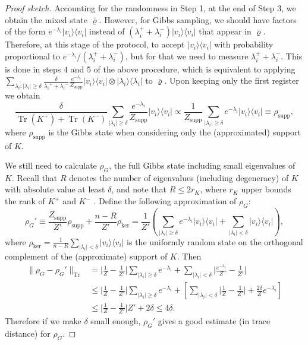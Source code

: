 \documentclass[a4paper,UKenglish,cleveref, autoref]{lipics-v2019}
\theoremstyle{remark}
\numberwithin{equation}{section}
\numberwithin{oracle}{section}
\numberwithin{remark}{section}
\newcommand{\ket}[1]{|#1\rangle}
\newcommand{\bra}[1]{\langle#1|}
\DeclareMathOperator{\tr}{Tr}
\begin{document}
\begin{proof}[Proof sketch]
Accounting for the randomness in Step 1, at the end of Step 3, we obtain  the mixed state $\bar\varrho$. However, for Gibbs sampling, we should have factors of the form  $e^{-\lambda_i}\ket{{v}_i}\bra{{v}_i}$ instead of $({\lambda}^+_i + {\lambda}^-_i) \ket{{v}_i}\bra{{v}_i}$ that appear in $\bar\varrho$. Therefore, at this stage of the protocol, to accept $\ket{{v}_i}\bra{{v}_i}$ with probability proportional to  $e^{-\lambda_i}/({\lambda}^+_i + {\lambda}^-_i)$, but for that we need to measure  ${\lambda}^+_i + {\lambda}^-_i$. This is done in steps 4 and 5 of the above procedure, which is equivalent to applying
$\sum_{\lambda_i:|\lambda_i|\ge\delta} \frac{\delta}{{\lambda_i}^+ +{\lambda_i}^-}\frac{e^{-{\lambda_i}}}{Z_{\text{supp}}} \ket{v_i}\bra{v_i}\otimes\ket{\lambda_i}\bra{\lambda_i}
$ to $\bar\varrho$. Upon keeping only the first register we obtain
\begin{equation}
\frac{\delta}{\tr(K^+)+\tr(K^-)}\sum_{|\lambda_i| \ge \delta} \frac{e^{-\lambda_i}}{Z_{\text{supp}}}\ket{v_i}\bra{v_i}\propto \frac{1}{Z_{\text{supp}}} \sum_{|\lambda_i| \ge \delta}  e^{-\lambda_i}\ket{v_i}\bra{v_i}\equiv\rho_{\text{supp}},
\end{equation}
where $\rho_{\text{supp}}$ is the Gibbs state when considering only the (approximated) support of $K$.

We still need to calculate $\rho_G$, the full Gibbs state including small eigenvalues of $K$. Recall that $R$ denotes the number of eigenvalues (including degeneracy) of $K$ with absolute value at least $\delta$, and note that $R \leq 2r_{K}$, where $r_{K}$ upper bounds the rank of $K^+$ and $K^-$ . Define the following approximation of $\rho_G$:
\begin{equation}
\rho_G' \equiv \frac{Z_{\text{supp}}}{Z'}\rho_{\text{supp}}+\frac{n-R}{Z'}\rho_{\text{ker}}= \frac{1}{Z'} (\sum_{|\lambda_i| \ge \delta} e^{-\lambda_i}\ket{v_i}\bra{v_i} + \sum_{|\lambda_i| < \delta} \ket{v_i}\bra{v_i}),
\end{equation}
where $\rho_{\text{ker}}=\frac{1}{n-R}\sum_{|\lambda_i| < \delta} \ket{v_i}\bra{v_i}$ is the  uniformly random state on the orthogonal complement of the (approximate) support of $K$.
Then
\begin{align}
\|\rho_G - \rho_G' \|_{\tr} &=\Big|\frac{1}{Z}-\frac{1}{Z'}\Big|\sum_{|\lambda_i|\ge\delta}e^{-\lambda_i}+\sum_{|\lambda_i|<\delta}\Big|\frac{e^{-\lambda_i}}{Z}-\frac{1}{Z'}\Big| \\
&\le\Big|\frac{1}{Z}-\frac{1}{Z'}\Big|\sum_{|\lambda_i|\ge\delta} e^{-\lambda_i}+\left[\sum_{|\lambda_i|<\delta}\Big|\frac{1}{Z}-\frac{1}{Z'}\Big|+\frac{2\delta}{Z}e^{-\lambda_i}\right] \\
&\le\Big|\frac{1}{Z}-\frac{1}{Z'}\Big|Z'+2\delta\le4\delta.
\end{align}
Therefore if we make $\delta$ small enough, $\rho_G'$ gives a good estimate (in trace distance) for $\rho_G$.


\end{proof}
\end{document}
